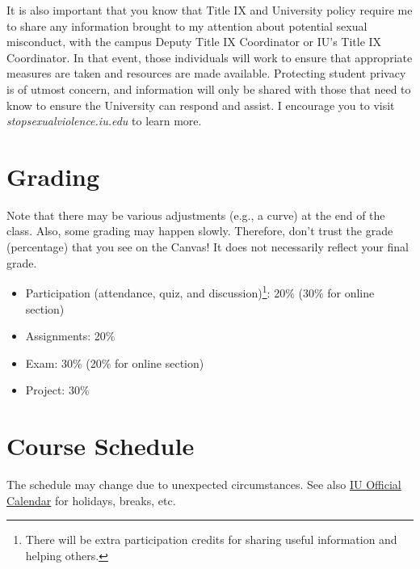 \documentclass[11pt,article,oneside]{memoir} %
\begin{document}
\begin{enumerate}
\begin{enumerate}
\end{enumerate}

It is also important that you know that Title IX and University policy require
me to share any information brought to my attention about potential sexual
misconduct, with the campus Deputy Title IX Coordinator or IU's Title IX
Coordinator. In that event, those individuals will work to ensure that
appropriate measures are taken and resources are made available. Protecting
student privacy is of utmost concern, and information will only be shared with
those that need to know to ensure the University can respond and assist. I
encourage you to visit \emph{stopsexualviolence.iu.edu} to learn more.


\end{enumerate}
\section{Grading}\label{sec:grading_tentative_} %

Note that there may be various adjustments (e.g., a curve) at the end of the class. Also, some grading may happen slowly. Therefore, don't trust the grade (percentage) that you see on the Canvas! It does not necessarily reflect your final grade.

\vspace{-10pt}
\begin{itemize}\itemsep=0pt

\item Participation (attendance, quiz, and discussion)\footnote{There will be extra participation credits for sharing useful information and helping others.}: 20\%  (30\% for online section)

\item Assignments: 20\%

\item Exam: 30\% (20\% for online section)

\item Project: 30\%

\end{itemize}
\clearpage
\section{Course Schedule} %

The schedule may change due to unexpected circumstances. See also \href{https://registrar.indiana.edu/official-calendar/index.shtml}{IU Official Calendar} for holidays, breaks, etc. 
\end{document}
